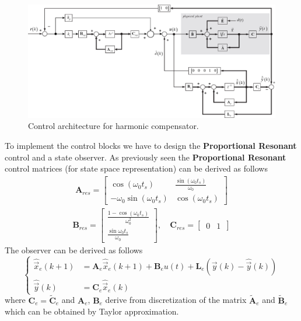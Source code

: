 \documentclass[11pt,a4paper,oneside]{book}
\numberwithin{equation}{section}
\theoremstyle{it}
\theoremstyle{definition}
\begin{document}
\begin{figure}[H]
	\centering
	\includegraphics[width = 500pt, angle = 0, 
	keepaspectratio]{figures/single_phase_inverter/harmonic_comp_1.eps}
	\captionsetup{width=0.5\textwidth, font=small}		
	\caption{Control architecture for harmonic compensator.}
	\label{figure_singlephaseinverter_ctrl}
\end{figure}
To implement the control blocks we have to design the \textbf{Proportional 
	Resonant} control and a state observer. As previously seen the \textbf{Proportional 
	Resonant} control matrices (for state space representation) can be derived as follows
\begin{equation}
	\begin{aligned}
		\mathbf{A}_{res} =\left[ 
		\begin{matrix}
			\cos(\omega_0t_s) & \frac{\sin(\omega_0t_s)}{\omega_0} \\[8pt]
			-\omega_0 \sin(\omega_0t_s) & \cos(\omega_0t_s)
		\end{matrix}
		\right]
	\end{aligned}
\end{equation}
\begin{equation}
	\begin{aligned}
		\mathbf{B}_{res} = 
		\begin{bmatrix} \frac{1-\cos(\omega_0t_s)}{\omega_0^2} \\[6pt]
			\frac{\sin{\omega_0t_s}}{\omega_0} \end{bmatrix}, \quad
		\mathbf{C}_{res} = \begin{bmatrix} \, 0 & 1 \, \end{bmatrix}
	\end{aligned}
\end{equation}
The observer can be derived as follows
\begin{equation}
	\left\lbrace \begin{aligned}
		\hat{\vec{x}}_e(k+1) &= {\mathbf{A}}_e \hat{\vec{x}}_e(k+1) + 
		{\mathbf{B}}_e u(t) + {\mathbf{L}}_e\left( \vec{y}(k) - 
		\hat{\vec{y}}(k)\right) \\[6pt]
		{\hat{\vec{y}}}(k) &= {\mathbf{C}}_e \hat{\vec{x}}_e(k)
	\end{aligned}\right. 
\end{equation}
where ${\mathbf{C}}_e = \tilde{\mathbf{C}}_e$ and ${\mathbf{A}}_e$, 
${\mathbf{B}}_e$ derive from discretization of the matrix 
$\tilde{\mathbf{A}}_e$ and $\tilde{\mathbf{B}}_e$ which can be obtained by 
Taylor approximation.
\end{document}
